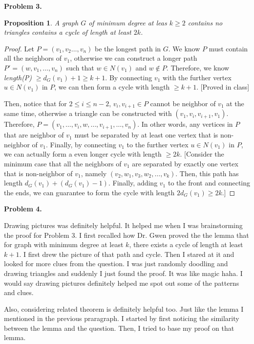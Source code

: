 \documentclass{article}
\newtheorem{prop}[thm]{Proposition}
\begin{document}
\textbf{Problem 3.}
\begin{prop}
    A graph $G$ of minimum degree at leas $k\ge 2$ contains no triangles contains a cycle of length at least $2k$.
\end{prop}
\begin{proof}
    Let $P = (v_1, v_2 \dots, v_n)$ be the longest path in $G$.
    We know $P$ must contain all the neighbors of $v_1$, otherwise we can construct a longer path $P' = (w, v_1, \dots, v_n)$ such that $w\in N(v_1)$ and $w \notin P$. 
    Therefore, we know \emph{length(P)} $\ge d_G(v_1) + 1 \ge k + 1$.
    By connecting $v_1$ with the further vertex $u \in N(v_1)$ in $P$, we can then form a cycle with length $\ge k+1$. [Proved in class]

    Then, notice that for $2\le i \le n-2$, $v_i, v_{i+1} \in P$ cannot be neighbor of $v_1$ at the same time, otherwise a triangle can be constructed with $(v_1, v_i, v_{i+1}, v_1)$.
    Therefore, $P = (v_1, \dots, v_i, w, \dots, v_{i+1}, \dots, v_n)$. 
    In other words, any vertices in $P$ that are neighbor of $v_1$ must be separated by at least one vertex that is non-neighbor of $v_1$.
    Finally, by connecting $v_1$ to the further vertex $u \in N(v_1)$ in $P$, we can actually form a even longer cycle with length $\ge 2k$.
    [Consider the minimum case that all the neighbors of $v_1$ are separated by exactly one vertex that is non-neighbor of $v_1$, namely $(v_2, w_1, v_3, w_2, \dots, v_k)$. Then, this path has length $d_G(v_1) + (d_G(v_1)-1)$. Finally, adding $v_1$ to the front and connecting the ends, we can guarantee to form the cycle with length $2d_G(v_1) \ge 2k$.]
\end{proof}
\bigbreak

\textbf{Problem 4.}

Drawing pictures was definitely helpful. It helped me when I was brainstorming the proof for Problem 3. 
I first recalled how Dr. Gwen proved the the lemma that for graph with minimum degree at least $k$, there exists a cycle of length at least $k+1$.
I first drew the picture of that path and cycle. Then I stared at it and looked for more clues from the question.
I was just randomly doodling and drawing triangles and suddenly I just found the proof. It was like magic haha.
I would say drawing pictures definitely helped me spot out some of the patterns and clues.

Also, considering related theorem is definitely helpful too. Just like the lemma I mentioned in the previous praragraph. 
I started by first noticing the similarity between the lemma and the question. 
Then, I tried to base my proof on that lemma.
\end{document}
